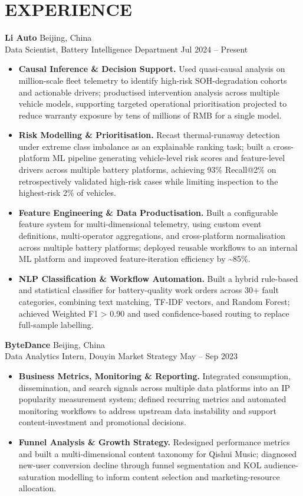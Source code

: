 \documentclass[a4paper,10pt]{article}
\begin{document}
\section{EXPERIENCE}
\noindent\textbf{Li Auto} \hfill Beijing, China\\
Data Scientist, Battery Intelligence Department \hfill Jul 2024 -- Present
\begin{itemize}
    \item \textbf{Causal Inference \& Decision Support.} Used quasi-causal analysis on million-scale fleet telemetry to identify high-risk SOH-degradation cohorts and actionable drivers; productised intervention analysis across multiple vehicle models, supporting targeted operational prioritisation projected to reduce warranty exposure by tens of millions of RMB for a single model.
    \item \textbf{Risk Modelling \& Prioritisation.} Recast thermal-runaway detection under extreme class imbalance as an explainable ranking task; built a cross-platform ML pipeline generating vehicle-level risk scores and feature-level drivers across multiple battery platforms, achieving 93\% Recall@2\% on retrospectively validated high-risk cases while limiting inspection to the highest-risk 2\% of vehicles.
    \item \textbf{Feature Engineering \& Data Productisation.} Built a configurable feature system for multi-dimensional telemetry, using custom event definitions, multi-operator aggregations, and cross-platform normalisation across multiple battery platforms; deployed reusable workflows to an internal ML platform and improved feature-iteration efficiency by \textasciitilde85\%.
    \item \textbf{NLP Classification \& Workflow Automation.} Built a hybrid rule-based and statistical classifier for battery-quality work orders across 30+ fault categories, combining text matching, TF-IDF vectors, and Random Forest; achieved Weighted F1 > 0.90 and used confidence-based routing to replace full-sample labelling.
\end{itemize}

\vspace{2pt}
\noindent\textbf{ByteDance} \hfill Beijing, China\\
Data Analytics Intern, Douyin Market Strategy \hfill May -- Sep 2023
\begin{itemize}
    \item \textbf{Business Metrics, Monitoring \& Reporting.} Integrated consumption, dissemination, and search signals across multiple data platforms into an IP popularity measurement system; defined recurring metrics and automated monitoring workflows to address upstream data instability and support content-investment and promotional decisions.
    \item \textbf{Funnel Analysis \& Growth Strategy.} Redesigned performance metrics and built a multi-dimensional content taxonomy for Qishui Music; diagnosed new-user conversion decline through funnel segmentation and KOL audience-saturation modelling to inform content selection and marketing-resource allocation.
\end{itemize}
\end{document}
